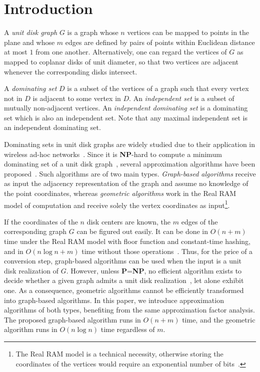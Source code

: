 \documentclass[preprint,12pt]{elsarticle}
\begin{document}
\section{Introduction}

A \emph{unit disk graph} $G$ is a graph whose $n$ vertices can be mapped to points in the plane and whose $m$ edges are defined by pairs of points within Euclidean distance at most $1$ from one another. Alternatively, one can regard the vertices of $G$ as mapped to coplanar disks of unit diameter, so that two vertices are adjacent whenever the corresponding disks intersect.

A \emph{dominating set} $D$ is a subset of the vertices of a graph such that every vertex not in $D$ is adjacent to some vertex in $D$. An \emph{independent set} is a subset of mutually non-adjacent vertices. An \emph{independent dominating set} is a dominating set which is also an independent set. Note that any maximal independent set is an independent dominating set.

Dominating sets in unit disk graphs are widely studied due to their application in wireless ad-hoc networks~\cite{heuristics}. Since it is \textbf{NP}-hard to compute a minimum dominating set of a unit disk graph~\cite{udg}, several approximation algorithms have been proposed~\cite{cccg,erlebach10,esa-Gibson,ptas-geometric,heuristics,ptas-graph-journal,zou11}. Such algorithms are of two main types. \emph{Graph-based algorithms} receive as input the adjacency representation of the graph and assume no knowledge of the point coordinates, whereas \emph{geometric algorithms} work in the Real RAM model of computation and receive solely the vertex coordinates as input\footnote{The Real RAM model is a technical necessity, otherwise storing the coordinates of the vertices would require an exponential number of bits~\cite{integer}.}. 

If the coordinates of the $n$ disk centers are known, the $m$ edges of the corresponding graph $G$ can be figured out easily. It can be done in $O(n+m)$ time under the Real RAM model with floor function and constant-time hashing, and in $O(n \log n + m)$ time without those operations~\cite{bentley}. Thus, for the price of a conversion step, graph-based algorithms can be used when the input is a unit disk realization of $G$. However, unless \textbf{P}=\textbf{NP}, no efficient algorithm exists to decide whether a given graph admits a unit disk realization~\cite{breu}, let alone exhibit one. As a consequence, geometric algorithms cannot be efficiently transformed into graph-based algorithms. In this paper, we introduce approximation algorithms of both types, benefiting from the same approximation factor analysis. The proposed graph-based algorithm runs in $O(n+m)$ time, and the geometric algorithm runs in $O(n \log n)$ time regardless of $m$.
\end{document}
